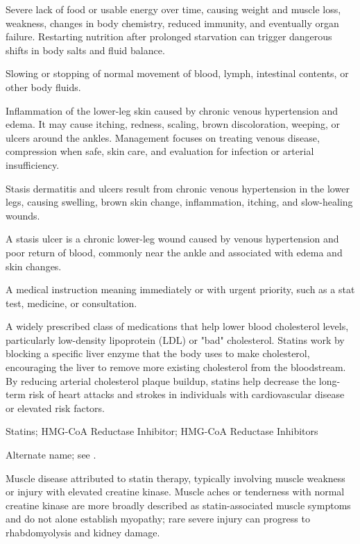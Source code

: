  Severe lack of food or usable energy over time, causing weight and muscle loss, weakness, changes in body chemistry, reduced immunity, and eventually organ failure. Restarting nutrition after prolonged starvation can trigger dangerous shifts in body salts and fluid balance.

 Slowing or stopping of normal movement of blood, lymph, intestinal contents, or other body fluids.

 Inflammation of the lower-leg skin caused by chronic venous hypertension and edema. It may cause itching, redness,
scaling, brown discoloration, weeping, or ulcers around the ankles. Management focuses on treating venous disease,
compression when safe, skin care, and evaluation for infection or arterial insufficiency.

 Stasis dermatitis and ulcers result from chronic venous hypertension in the lower legs, causing swelling, brown skin change, inflammation, itching, and slow-healing wounds.

 A stasis ulcer is a chronic lower-leg wound caused by venous hypertension and poor return of blood, commonly near the ankle and associated with edema and skin changes.

 A medical instruction meaning immediately or with urgent priority, such as a stat test, medicine, or consultation.

 A widely prescribed class of medications that help lower blood cholesterol levels, particularly low-density lipoprotein (LDL) or "bad" cholesterol. Statins work by blocking a specific liver enzyme that the body uses to make cholesterol, encouraging the liver to remove more existing cholesterol from the bloodstream. By reducing arterial cholesterol plaque buildup, statins help decrease the long-term risk of heart attacks and strokes in individuals with cardiovascular disease or elevated risk factors.

\synonyms
Statins; HMG-CoA Reductase Inhibitor; HMG-CoA Reductase Inhibitors

 Alternate name; see .

 Muscle disease attributed to statin therapy, typically involving muscle weakness or injury with elevated creatine kinase. Muscle aches or tenderness with normal creatine kinase are more broadly described as statin-associated muscle symptoms and do not alone establish myopathy; rare severe injury can progress to rhabdomyolysis and kidney damage.


